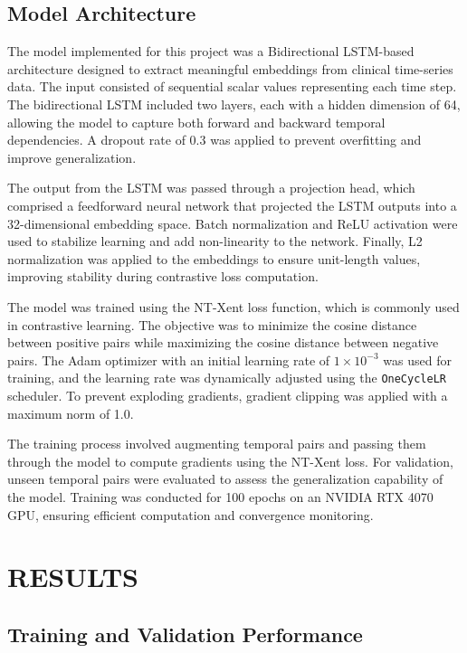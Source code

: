 \documentclass[twocolumn]{article}
\begin{document}
    \subsection{Model Architecture}
    The model implemented for this project was a Bidirectional LSTM-based architecture
    designed to extract meaningful embeddings from clinical time-series data.
    The input consisted of sequential scalar values representing each time step.
    The bidirectional LSTM included two layers, each with a hidden dimension of
    64, allowing the model to capture both forward and backward temporal dependencies.
    A dropout rate of 0.3 was applied to prevent overfitting and improve
    generalization.

    The output from the LSTM was passed through a projection head, which comprised
    a feedforward neural network that projected the LSTM outputs into a 32-dimensional
    embedding space. Batch normalization and ReLU activation were used to
    stabilize learning and add non-linearity to the network. Finally, L2
    normalization was applied to the embeddings to ensure unit-length values, improving
    stability during contrastive loss computation.

    The model was trained using the NT-Xent loss function, which is commonly
    used in contrastive learning. The objective was to minimize the cosine distance
    between positive pairs while maximizing the cosine distance between negative
    pairs. The Adam optimizer with an initial learning rate of
    $1 \times 10^{-3}$ was used for training, and the learning rate was dynamically
    adjusted using the \texttt{OneCycleLR} scheduler. To prevent exploding gradients,
    gradient clipping was applied with a maximum norm of 1.0.

    The training process involved augmenting temporal pairs and passing them
    through the model to compute gradients using the NT-Xent loss. For validation,
    unseen temporal pairs were evaluated to assess the generalization capability
    of the model. Training was conducted for 100 epochs on an NVIDIA RTX 4070 GPU,
    ensuring efficient computation and convergence monitoring.

    \section{ \large RESULTS}

    \subsection{Training and Validation Performance}
\end{document}
